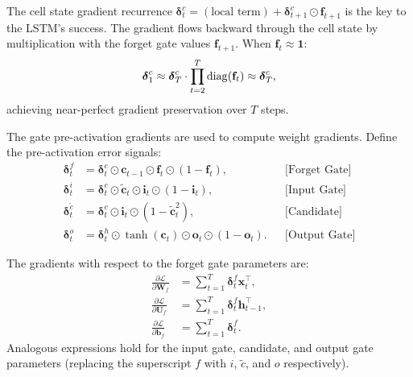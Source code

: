 \documentclass[11pt,a4paper]{article}
\begin{document}
\begin{keyresult}[title={LSTM Gradient Highway}]
The cell state gradient recurrence
$\boldsymbol{\delta}_t^c = (\text{local term}) +
\boldsymbol{\delta}_{t+1}^c \odot \mathbf{f}_{t+1}$
is the key to the LSTM's success.  The gradient flows backward
through the cell state by multiplication with the forget gate values
$\mathbf{f}_{t+1}$.  When $\mathbf{f}_t \approx \mathbf{1}$:
\[
  \boldsymbol{\delta}_1^c \approx \boldsymbol{\delta}_T^c \cdot
    \prod_{t=2}^{T} \operatorname{diag}(\mathbf{f}_t) \approx
    \boldsymbol{\delta}_T^c,
\]
achieving near-perfect gradient preservation over $T$ steps.
\end{keyresult}

The gate pre-activation gradients are used to compute weight
gradients.  Define the pre-activation error signals:
\begin{align}
  \boldsymbol{\delta}_t^f &= \boldsymbol{\delta}_t^c \odot
    \mathbf{c}_{t-1} \odot \mathbf{f}_t \odot (1 - \mathbf{f}_t),
    && \text{[Forget Gate]} \label{eq:delta-f} \\
  \boldsymbol{\delta}_t^i &= \boldsymbol{\delta}_t^c \odot
    \tilde{\mathbf{c}}_t \odot \mathbf{i}_t \odot
    (1 - \mathbf{i}_t),
    && \text{[Input Gate]} \label{eq:delta-i} \\
  \boldsymbol{\delta}_t^{\tilde{c}} &= \boldsymbol{\delta}_t^c
    \odot \mathbf{i}_t \odot (1 - \tilde{\mathbf{c}}_t^2),
    && \text{[Candidate]} \label{eq:delta-c-tilde} \\
  \boldsymbol{\delta}_t^o &= \boldsymbol{\delta}_t^h \odot
    \tanh(\mathbf{c}_t) \odot \mathbf{o}_t \odot
    (1 - \mathbf{o}_t).
    && \text{[Output Gate]} \label{eq:delta-o}
\end{align}

\begin{theorem}
\label{thm:lstm-weight-grads}
The gradients with respect to the forget gate parameters are:
\begin{align}
  \frac{\partial \mathcal{L}}{\partial \mathbf{W}_f}
    &= \sum_{t=1}^{T} \boldsymbol{\delta}_t^f \mathbf{x}_t^\top,
    \label{eq:grad-Wf} \\
  \frac{\partial \mathcal{L}}{\partial \mathbf{U}_f}
    &= \sum_{t=1}^{T} \boldsymbol{\delta}_t^f
       \mathbf{h}_{t-1}^\top,
    \label{eq:grad-Uf} \\
  \frac{\partial \mathcal{L}}{\partial \mathbf{b}_f}
    &= \sum_{t=1}^{T} \boldsymbol{\delta}_t^f.
    \label{eq:grad-bf}
\end{align}
Analogous expressions hold for the input gate, candidate, and output
gate parameters (replacing the superscript $f$ with $i$,
$\tilde{c}$, and $o$ respectively).
\end{theorem}
\end{document}
